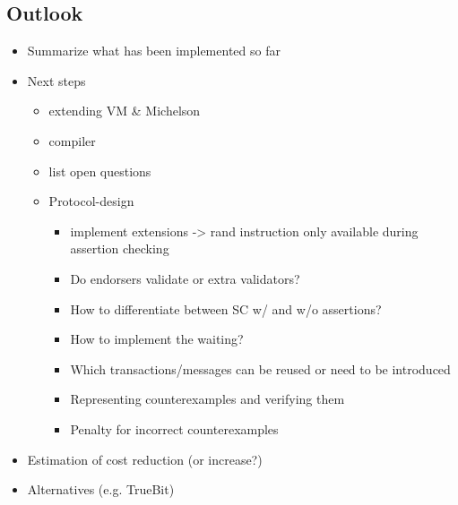 
\subsection{Outlook}

\draft{}
\begin{itemize}
\item Summarize what has been implemented so far
\item Next steps
	\begin{itemize}
	\item extending VM \& Michelson
	\item compiler
	\item list open questions
	\item Protocol-design
		\begin{itemize}
		\item implement extensions -> rand instruction only available during assertion checking
		\item Do endorsers validate or extra validators?
		\item How to differentiate between SC w/ and w/o assertions?
		\item How to implement the waiting?
		\item Which transactions/messages can be reused or need to be introduced
		\item Representing counterexamples and verifying them
		\item Penalty for incorrect counterexamples
		\end{itemize}
	\end{itemize}
\item Estimation of cost reduction (or increase?)
\item Alternatives (e.g. TrueBit)
\end{itemize}